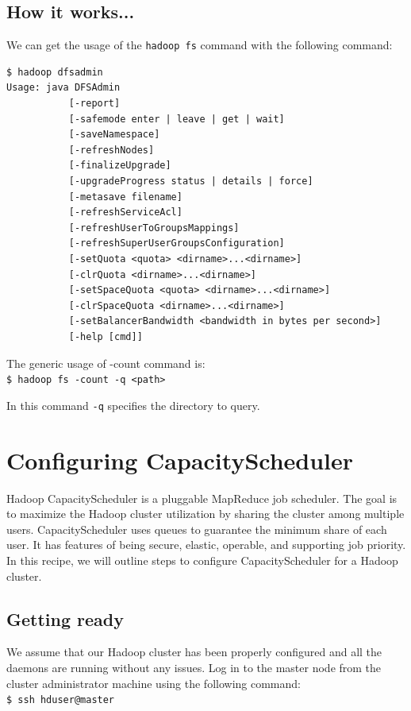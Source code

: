 \subsection*{How it works...}
We can get the usage of the \verb|hadoop fs| command with the following command:
\lstset{style=bashstyle}
\begin{lstlisting}
$ hadoop dfsadmin
Usage: java DFSAdmin
           [-report]
           [-safemode enter | leave | get | wait]
           [-saveNamespace]
           [-refreshNodes]
           [-finalizeUpgrade]
           [-upgradeProgress status | details | force]
           [-metasave filename]
           [-refreshServiceAcl]
           [-refreshUserToGroupsMappings]
           [-refreshSuperUserGroupsConfiguration]
           [-setQuota <quota> <dirname>...<dirname>]
           [-clrQuota <dirname>...<dirname>]
           [-setSpaceQuota <quota> <dirname>...<dirname>]
           [-clrSpaceQuota <dirname>...<dirname>]
           [-setBalancerBandwidth <bandwidth in bytes per second>]
           [-help [cmd]]
\end{lstlisting}

The generic usage of -count command is: \\
\verb|$ hadoop fs -count -q <path>|

In this command \verb|-q| specifies the directory to query. 

\section{Configuring CapacityScheduler}
Hadoop CapacityScheduler is a pluggable MapReduce job scheduler. The goal is to maximize the Hadoop cluster utilization by sharing the cluster among multiple users. CapacityScheduler uses queues to guarantee the minimum share of each user. It has features of being secure, elastic, operable, and supporting job priority. In this recipe, we will outline steps to configure CapacityScheduler for a Hadoop cluster.

\subsection*{Getting ready}
We assume that our Hadoop cluster has been properly configured and all the daemons are running without any issues.
Log in to the master node from the cluster administrator machine using the following command:\\
\verb|$ ssh hduser@master|

